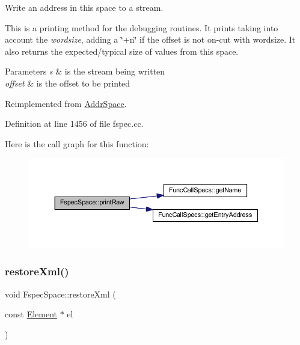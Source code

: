 Write an address in this space to a stream. 

This is a printing method for the debugging routines. It prints taking into account the {\itshape wordsize}, adding a \char`\"{}+n\char`\"{} if the offset is not on-\/cut with wordsize. It also returns the expected/typical size of values from this space. 
\begin{DoxyParams}{Parameters}
{\em s} & is the stream being written \\
\hline
{\em offset} & is the offset to be printed \\
\hline
\end{DoxyParams}


Reimplemented from \mbox{\hyperlink{class_addr_space_a76819b70cd6b6ae8601ac1821f86b929}{Addr\+Space}}.



Definition at line 1456 of file fspec.\+cc.

Here is the call graph for this function\+:
\nopagebreak
\begin{figure}[H]
\begin{center}
\leavevmode
\includegraphics[width=350pt]{class_fspec_space_a48b1e30f1554fd950f5c240407ca20db_cgraph}
\end{center}
\end{figure}
\mbox{\label{class_fspec_space_ad0061e3e6e13bdd7349f643e44d8947d}} 
\subsubsection{\texorpdfstring{restoreXml()}{restoreXml()}}
{\footnotesize\ttfamily void Fspec\+Space\+::restore\+Xml (\begin{DoxyParamCaption}\item[{const \mbox{\hyperlink{class_element}{Element}} $\ast$}]{el }\end{DoxyParamCaption})\hspace{0.3cm}{\ttfamily [virtual]}}



